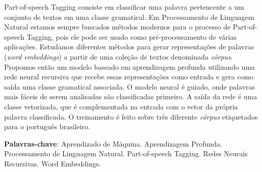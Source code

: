 \begin{resumo}
 
Part-of-speech Tagging consiste em classificar uma palavra pertencente a um conjunto de textos em uma classe gramatical. Em Processamento de Linguagem Natural estamos sempre buscados métodos modernos para o processo de Part-of-speech Tagging, pois ele pode ser usado como pré-processamento de várias aplicações. Estudamos diferentes métodos para gerar representações de palavras (\textit{word embeddings}) a partir de uma coleção de textos denominada \textit{córpus}. Propomos então um modelo baseado em aprendizagem profunda utilizando uma rede neural recursiva que recebe essas representações como entrada e gera como saída uma classe gramatical associada. O modelo neural é guiado, onde palavras mais fáceis de serem analisadas são classificadas primeiro. A saída da rede é uma classe vetorizada, que é complementada na entrada com o vetor da própria palavra classificada. O treinamento é feito sobre três diferente \textit{córpus} etiquetados para o português brasileiro.

 \vspace{\onelineskip}
    
 \noindent
 \textbf{Palavras-chave}: Aprendizado de Máquina. Aprendizagem Profunda. Processamento de Linguagem Natural. Part-of-speech Tagging. Redes Neurais Recursivas. Word Embeddings.
\end{resumo}


